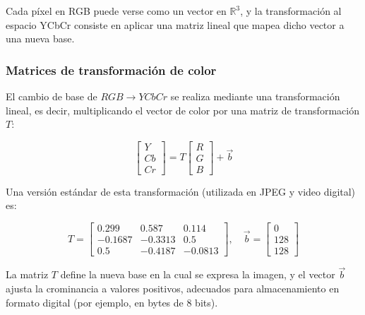 \documentclass[8pt,a4paper]{article}
\theoremstyle{definition}
\theoremstyle{remark}
\begin{document}
\begin{multicols}{2}
            Cada píxel en RGB puede verse como un vector en \(\mathbb{R}^3\), y la transformación al espacio YCbCr consiste en aplicar una matriz lineal que mapea dicho vector a una nueva base.
            
            \subsubsection{Matrices de transformación de color}
            
            El cambio de base de \(RGB \rightarrow YCbCr\) se realiza mediante una transformación lineal, es decir, multiplicando el vector de color por una matriz de transformación \( T \):
            
            \[
            \begin{bmatrix}
            Y\\
            Cb\\
            Cr
            \end{bmatrix}
            =
            T
            \begin{bmatrix}
            R \\
            G \\
            B
            \end{bmatrix}
            +
            \vec{b}
            \]
            
            Una versión estándar de esta transformación (utilizada en JPEG y video digital) es:
            
            \[
            T =
            \begin{bmatrix}
            0.299 & 0.587 & 0.114 \\
            -0.1687 & -0.3313 & 0.5 \\
            0.5 & -0.4187 & -0.0813
            \end{bmatrix},
            \quad
            \vec{b} =
            \begin{bmatrix}
            0 \\
            128 \\
            128
            \end{bmatrix}
            \]
            
            La matriz \(T\) define la nueva base en la cual se expresa la imagen, y el vector \(\vec{b}\) ajusta la crominancia a valores positivos, adecuados para almacenamiento en formato digital (por ejemplo, en bytes de 8 bits).
            

\end{multicols}
\end{document}
